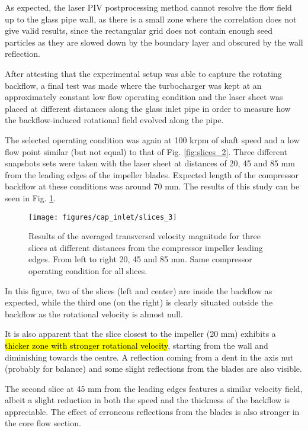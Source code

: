As expected, the laser PIV postprocessing method cannot resolve the flow field up to the glass pipe wall, as there is a small zone where the correlation does not give valid results, since the rectangular grid does not contain enough seed particles as they are slowed down by the boundary layer and obscured by the wall reflection.

After attesting that the experimental setup was able to capture the rotating backflow, a final test was made where the turbocharger was kept at an approximately constant low flow operating condition and the laser sheet was placed at different distances along the glass inlet pipe in order to measure how the backflow-induced rotational field evolved along the pipe. 

The selected operating condition was again at 100 krpm of shaft speed and a low flow point similar (but not equal) to that of Fig. \ref{fig:slices_2}. Three different snapshots sets were taken with the laser sheet at distances of 20, 45 and 85 mm from the leading edges of the impeller blades. Expected length of the compressor backflow at these conditions was around 70 mm. The results of this study can be seen in Fig. \ref{fig:slices_3}.

\begin{figure}[bt!]
\hspace{-0.1\textwidth}
\texttt{[image: figures/cap\_inlet/slices\_3]}
\caption{Results of the averaged transversal velocity magnitude for three slices at different distances from the compressor impeller leading edges. From left to right 20, 45 and 85 mm. Same compressor operating condition for all slices.}
\label{fig:slices_3}
\end{figure}

In this figure, two of the slices (left and center) are inside the backflow as expected, while the third one (on the right) is clearly situated outside the backflow as the rotational velocity is almost null. 

It is also apparent that the slice closest to the impeller (20 mm) exhibits a \hl{thicker zone with stronger rotational velocity}, starting from the wall and diminishing towards the centre. A reflection coming from a dent in the axis nut (probably for balance) and some slight reflections from the blades are also visible.

The second slice at 45 mm from the leading edges features a similar velocity field, albeit a slight reduction in both the speed and the thickness of the backflow is appreciable. The effect of erroneous reflections from the blades is also stronger in the core flow section.

